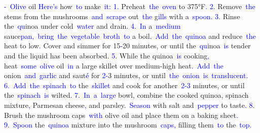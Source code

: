 \documentclass{article}
\begin{document}
\begin{tcolorbox}[colframe=black,colback=white]
{}\textcolor{blue}{-}\textcolor{blue}{~Olive} oil\textcolor{blue}{
}\textcolor{blue}{Here}\textcolor{blue}{'s} how\textcolor{blue}{~to} make\textcolor{blue}{~it}\textcolor{blue}{:
}\textcolor{blue}{1}\textcolor{blue}{.} Preheat\textcolor{blue}{~the}\textcolor{blue}{~oven} to 375°F\textcolor{blue}{.
}\textcolor{blue}{2}. Remove\textcolor{blue}{~the} stems from the mushrooms\textcolor{blue}{~and}\textcolor{blue}{~scrape} out\textcolor{blue}{~the} g\textcolor{blue}{ills} with a\textcolor{blue}{~spoon}\textcolor{blue}{.
}\textcolor{blue}{3}. Rinse the\textcolor{blue}{~qu}inoa under cold\textcolor{blue}{~water} and drain\textcolor{blue}{.
}\textcolor{blue}{4}.\textcolor{blue}{~In} a\textcolor{blue}{~medium} sauce\textcolor{blue}{pan}\textcolor{blue}{,}\textcolor{blue}{~bring}\textcolor{blue}{~the}\textcolor{blue}{~vegetable}\textcolor{blue}{~broth}\textcolor{blue}{~to} a boil\textcolor{blue}{.}\textcolor{blue}{~Add}\textcolor{blue}{~the}\textcolor{blue}{~qu}\textcolor{blue}{inoa} and reduce\textcolor{blue}{~the} heat to low\textcolor{blue}{.} Cover and simmer for 15\textcolor{blue}{-}20 minutes, or until the\textcolor{blue}{~qu}inoa\textcolor{blue}{~is} tender and the liquid has been absorbed\textcolor{blue}{.
}\textcolor{blue}{5}. While the quinoa\textcolor{blue}{~is} cooking\textcolor{blue}{,} heat\textcolor{blue}{~some}\textcolor{blue}{~olive} oil\textcolor{blue}{~in} a large skillet over medium-high heat\textcolor{blue}{.}\textcolor{blue}{~Add}\textcolor{blue}{~the} onion\textcolor{blue}{~and}\textcolor{blue}{~garlic} and saut\textcolor{blue}{é} for \textcolor{blue}{2}\textcolor{blue}{-}3 minutes, or until\textcolor{blue}{~the}\textcolor{blue}{~onion}\textcolor{blue}{~is}\textcolor{blue}{~translucent}\textcolor{blue}{.
}\textcolor{blue}{6}\textcolor{blue}{.}\textcolor{blue}{~Add}\textcolor{blue}{~the}\textcolor{blue}{~spinach}\textcolor{blue}{~to} the\textcolor{blue}{~skillet} and cook for another\textcolor{blue}{~}\textcolor{blue}{2}\textcolor{blue}{-}\textcolor{blue}{3} minutes, or until the\textcolor{blue}{~spinach}\textcolor{blue}{~is} wilted\textcolor{blue}{.
}\textcolor{blue}{7}.\textcolor{blue}{~In}\textcolor{blue}{~a}\textcolor{blue}{~large} bowl, combine the cooked quinoa, spinach mixture\textcolor{blue}{,} Parmesan cheese\textcolor{blue}{,} and parsley.\textcolor{blue}{~Season} with salt and\textcolor{blue}{~pepper} to taste\textcolor{blue}{.
}\textcolor{blue}{8}. Brush the mushroom caps\textcolor{blue}{~with} olive oil and place them on a baking sheet\textcolor{blue}{.
}\textcolor{blue}{9}.\textcolor{blue}{~Spoon} the\textcolor{blue}{~qu}\textcolor{blue}{inoa} mixture into the mushroom\textcolor{blue}{~caps}\textcolor{blue}{,} filling them\textcolor{blue}{~to} the\textcolor{blue}{~top}\textcolor{blue}{.
}
\end{tcolorbox}
\end{document}
